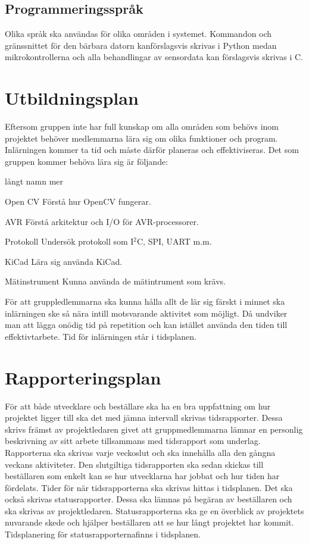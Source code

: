 \documentclass[projektplan/plan.tex]{subfiles}
\begin{document}
\subsection{Programmeringsspråk}
Olika språk ska användas för olika områden i systemet. Kommandon och gränssnittet för den bärbara datorn kanförslagsvis skrivas i Python medan mikrokontrollerna och alla behandlingar av sensordata kan förslagsvis skrivas i C.

\newpage
\section{Utbildningsplan}
Eftersom gruppen inte har full kunskap om alla områden som behövs inom projektet behöver medlemmarna lära sig om olika funktioner och program. Inlärningen kommer ta tid och måste därför planeras och effektiviseras. Det som gruppen kommer behöva lära sig är följande:

\begin{labeling}{långt namn mer}
    \item[Open CV] Förstå hur OpenCV fungerar.
    \item[AVR] Förstå arkitektur och I/O för
    AVR-processorer.
    \item[Protokoll] Undersök protokoll som
    I$^2$C, SPI, UART m.m.
    \item[KiCad] Lära sig använda KiCad.
    \item[Mätinstrument] Kunna använda de mätintrument som krävs.
\end{labeling}

För att gruppledlemmarna ska kunna hålla allt de lär sig färskt i minnet ska inlärningen ske så nära intill motsvarande aktivitet som möjligt. Då undviker man att lägga onödig tid på repetition och kan istället använda den tiden till effektivtarbete. Tid för inlärningen står i tidsplanen.

\section{Rapporteringsplan}
För att både utvecklare och beställare ska ha en bra uppfattning om hur projektet ligger till ska det med jämna intervall skrivas tidsrapporter. Dessa skrivs främst av projektledaren givet att gruppmedlemmarna lämnar en personlig beskrivning av sitt arbete tillsammans med tidsrapport som underlag. Rapporterna ska skrivas varje veckoslut och ska innehålla alla den gångna veckans aktiviteter. Den slutgiltiga tidsrapporten ska sedan skickas till beställaren som enkelt kan se hur utvecklarna har jobbat och hur tiden har fördelats. Tider för när tidsrapporterna ska skrivas hittas i tidsplanen.
Det ska också skrivas statusrapporter. Dessa ska lämnas på begäran av beställaren och ska skrivas av projektledaren. Statusrapporterna ska ge en överblick av projektets nuvarande skede och hjälper beställaren att se hur långt projektet har kommit. Tidsplanering för statusrapporternafinns i tidsplanen.
\end{document}
